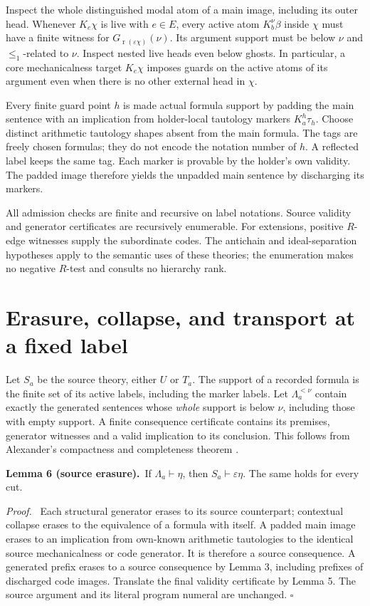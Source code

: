 \documentclass[11pt]{article}
\newcommand{\rk}{\operatorname{r}}
\newcommand{\cut}[2]{\Lambda_{#1}^{< #2}}
\newcommand{\eps}{\varepsilon}
\newcommand{\qed}{\hfill\ensuremath{\square}}
\newenvironment{proof}{\par\emph{Proof.}\ }{\qed\par}
\newcommand{\statement}[2]{\par\textbf{#1.}\ #2\par}
\begin{document}
Inspect the whole distinguished modal atom of a main image, including
its outer head. Whenever $K_e\chi$ is live with $e\in E$, every active
atom $K_b^\nu\beta$ inside $\chi$ must have a finite witness for
$G_{\rk(\eps\chi)}(\nu)$. Its argument support must be below $\nu$
and $\le_1$-related to $\nu$. Inspect nested live heads even below
ghosts. In particular, a core mechanicalness target $K_e\chi$ imposes
guards on the active atoms of its argument even when there is no other
external head in $\chi$.

Every finite guard point $h$ is made actual formula support by padding
the main sentence with an implication from holder-local tautology
markers $K_a^h\tau_h$. Choose distinct arithmetic tautology shapes
absent from the main formula. The tags are freely chosen formulas;
they do not encode the notation number of $h$. A reflected label keeps
the same tag. Each marker is provable by the holder's own validity.
The padded image therefore yields the unpadded main sentence by
discharging its markers.

All admission checks are finite and recursive on label notations.
Source validity and generator certificates are recursively enumerable.
For extensions, positive $R$-edge witnesses supply the subordinate
codes. The antichain and ideal-separation hypotheses apply to the
semantic uses of these theories; the enumeration makes no negative
$R$-test and consults no hierarchy rank.

\section{Erasure, collapse, and transport at a fixed label}\label{sec:transport}

Let $S_a$ be the source theory, either $U$ or $T_a$. The support of a
recorded formula is the finite set of its active labels, including
the marker labels. Let $\cut a\nu$ contain exactly the generated
sentences whose \emph{whole} support is below $\nu$, including those
with empty support. A finite consequence certificate contains its
premises, generator witnesses and a valid implication to its conclusion.
This follows from Alexander's compactness and completeness theorem
\cite[Theorem 1.2.6 and \S1.3]{Alexander}.

\statement{Lemma 6 (source erasure)}{If $\Lambda_a\vdash\eta$, then
$S_a\vdash\eps\eta$. The same holds for every cut.}

\begin{proof}
Each structural generator erases to its source counterpart; contextual
collapse erases to the equivalence of a formula with itself. A padded
main image erases to an implication from own-known arithmetic
tautologies to the identical source mechanicalness or code generator.
It is therefore a source consequence. A generated prefix erases to a
source consequence by Lemma 3, including prefixes of discharged code
images. Translate the final validity certificate by Lemma 5.
The source argument and its literal program numeral are unchanged.
\end{proof}
\end{document}
